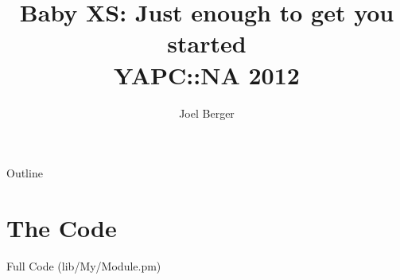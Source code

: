 \documentclass{beamer}
\title[Baby XS]{Baby XS: Just enough to get you started\\YAPC::NA 2012}
\author{Joel Berger}
\institute[UIC]{University of Illinois at Chicago}
\begin{document}
\begin{frame}
  \maketitle
\end{frame}

\begin{frame}{Outline}
  \tableofcontents
\end{frame}

\section{The Code}

\begin{frame}[fragile]{Full Code (lib/My/Module.pm)}
  \tiny
  
\end{frame}
\end{document}
